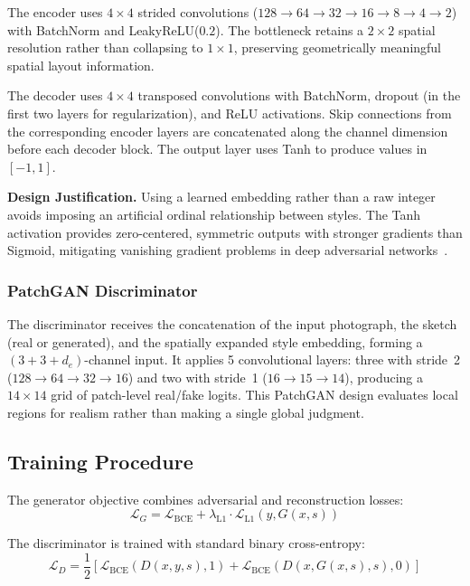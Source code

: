 \documentclass[conference]{IEEEtran}
\begin{document}
The encoder uses $4 \times 4$ strided convolutions ($128 \rightarrow 64 \rightarrow 32 \rightarrow 16 \rightarrow 8 \rightarrow 4 \rightarrow 2$) with BatchNorm and LeakyReLU($0.2$). The bottleneck retains a $2 \times 2$ spatial resolution rather than collapsing to $1 \times 1$, preserving geometrically meaningful spatial layout information.

The decoder uses $4 \times 4$ transposed convolutions with BatchNorm, dropout (in the first two layers for regularization), and ReLU activations. Skip connections from the corresponding encoder layers are concatenated along the channel dimension before each decoder block. The output layer uses Tanh to produce values in $[-1, 1]$.

\textbf{Design Justification.} Using a learned embedding rather than a raw integer avoids imposing an artificial ordinal relationship between styles. The Tanh activation provides zero-centered, symmetric outputs with stronger gradients than Sigmoid, mitigating vanishing gradient problems in deep adversarial networks~\cite{isola2017image}.

\subsubsection{PatchGAN Discriminator}
The discriminator receives the concatenation of the input photograph, the sketch (real or generated), and the spatially expanded style embedding, forming a $(3 + 3 + d_e)$-channel input. It applies 5 convolutional layers: three with stride~2 ($128 \rightarrow 64 \rightarrow 32 \rightarrow 16$) and two with stride~1 ($16 \rightarrow 15 \rightarrow 14$), producing a $14 \times 14$ grid of patch-level real/fake logits. This PatchGAN design evaluates local regions for realism rather than making a single global judgment.

\subsection{Training Procedure}

The generator objective combines adversarial and reconstruction losses:
\begin{equation}
\mathcal{L}_G = \mathcal{L}_{\text{BCE}} + \lambda_{\text{L1}} \cdot \mathcal{L}_{\text{L1}}(y, G(x, s))
\end{equation}

The discriminator is trained with standard binary cross-entropy:
\begin{equation}
\mathcal{L}_D = \frac{1}{2}\left[\mathcal{L}_{\text{BCE}}(D(x, y, s), 1) + \mathcal{L}_{\text{BCE}}(D(x, G(x,s), s), 0)\right]
\end{equation}
\end{document}
